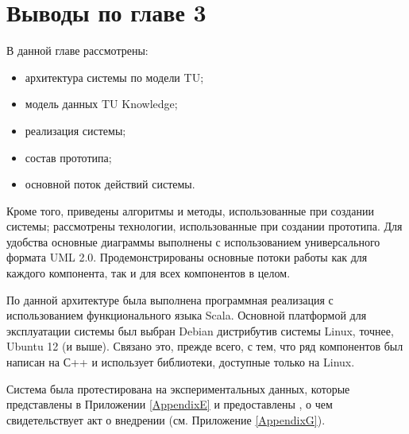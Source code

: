 \section{Выводы по главе 3}
В данной главе рассмотрены:
\begin{itemize}
	\item архитектура системы по модели TU;
	\item модель данных TU Knowledge;
	\item реализация системы;
	\item состав прототипа;
	\item основной поток действий системы.
\end{itemize} \par
Кроме того, приведены алгоритмы и методы, использованные при создании системы; рассмотрены технологии, использованные при создании прототипа. Для удобства основные диаграммы выполнены с использованием универсального формата UML 2.0. Продемонстрированы основные потоки работы как для каждого компонента, так и для всех компонентов в целом. \par
По данной архитектуре была выполнена программная реализация с использованием функционального языка Scala. Основной платформой для эксплуатации системы был выбран Debian дистрибутив системы Linux, точнее, Ubuntu 12 (и выше). Связано это, прежде всего, с тем, что ряд компонентов был написан на С++ и использует библиотеки, доступные только на Linux.  \par
Система была протестирована на экспериментальных данных, которые представлены в Приложении \ref{AppendixE} и предоставлены \icl, о чем свидетельствует акт о внедрении (см. Приложение \ref{AppendixG}).


\clearpage